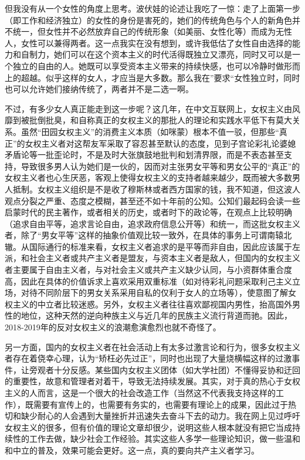 但我没有从一个女性的角度上思考。波伏娃的论述让我吃了一惊：走了上面第一步（即工作和经济独立）的女性的身份是害死的，她们的传统角色与个人的新角色并不统一，但女性并不必然放弃自己的传统形象（如美丽、女性化等）而成为无性人，女性可以兼得两者。这一点我实在没有想到，或许我低估了女性自由选择的能力和自制力，她们可以在这个资本主义的时代活得既独立又漂亮，同时又可以是一个独立的自由的人。她既可以享受资本主义带来的持续快感，也可以冷静时做形而上的超越。似乎这样的女人，才应当是大多数。那么我在”要求“女性独立时，同时也可以允许她们接纳传统了，两者并不是二选一啊。

不过，有多少女人真正能走到这一步呢？这几年，在中文互联网上，女权主义由风靡到被批倒批臭，和自称真正的女权主义的那批人的理论和实践水平低下有莫大关系。虽然“田园女权主义”的消费主义本质（如咪蒙）根本不值一驳，但那些“真正”的女权主义者对这帮友军采取了容忍甚至默认的态度，见到子宫论彩礼论婆媳矛盾论等一批歪论时，不是及时大张旗鼓地批判和划清界限，而是不表态甚至支持，导致很多男人认为她们是一伙的，因而对主张男女平等和男女公平的“真正”的女权主义者也心生厌恶，客观上使得女权主义的支持者越来越少，既而被大多数男人抵制。女权主义组织是不是收了穆斯林或者西方国家的钱，我不知道，但这波人观点分裂之严重、态度之模糊，甚至还不如十年前的公知。公知们最起码会读一些启蒙时代的民主著作，或者相关的历史，或者时下的政论等，在观点上比较明确（追求自由平等，追求言论自由，追求政府信息公开等）和统一，而这批女权主义者，除了“男女平等”这样的抽象价值观比较一致外，在具体的事务上可谓南辕北辙。从国际通行的标准来看，女权主义者追求的是平等而非自由，因此应该属于左派，和社会主义者或共产主义者是盟友，与资本主义者是敌人，但国内的女权主义者主要属于自由主义者，与对社会主义或共产主义缺少认同，与小资群体重合度高，因此在具体的价值诉求上喜欢采用双重标准（如对待彩礼问题采取利己主义立场，对待不同阶层下的男女关系采用自私的仅利于女人的立场等），使意图了解女权主义的中立者比较迷惑。另外，女权主义者往往喜欢鄙视国内男性，抬高国外男性的地位，这种天然的逆向种族主义与近几年的民族主义流行背道而驰。因此，2018-2019年的反对女权主义的浪潮愈演愈烈也就不奇怪了。

另一方面，国内的女权主义者在社会活动上有太多过激言论和行为，很多女权主义者存在着侥幸心理，认为“矫枉必先过正”，同时也出现了大量烧横幅这样的过激事件，让旁观者十分反感。某些国内女权主义团体（如大学社团）不懂得妥协和迂回的重要性，故意和管理者对着干，导致无法持续发展。其实，对于真的热心于女权主义的人而言，这是一个很大的社会改造工作（当然这不代表我支持这样的工作），既需要有宣传上的，也需要有务实的，也需要有理论上的成果，因此过于热切和缺少耐心的人会遇到大量挫折并迅速失去奋斗下去的动力。我在网上见过呼吁女权主义的很多，但有价值的理论文章却很少，说明这些人根本就没有把它当成持续性的工作去做，缺少社会工作经验。其实这些人多学一些理论知识，做一些温和和中立的普及，效果可能会更好。这一点，真的要向共产主义者学习。

